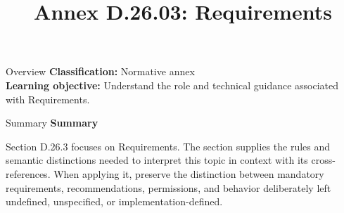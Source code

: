 \documentclass[10pt,letterpaper]{article}
\title{Annex D.26.03: Requirements}
\author{}
\date{}
\begin{document}
\maketitle
\begin{CornellOverviewBox}{Overview}
\textbf{Classification:} Normative annex\\[2pt]
\textbf{Learning objective:} Understand the role and technical guidance associated with Requirements.
\end{CornellOverviewBox}\begin{CornellSummaryBox}{Summary}
{\sffamily\bfseries\color{Accent} Summary}\par\vspace{3pt}Section D.26.3 focuses on Requirements. The section supplies the rules and semantic distinctions needed to interpret this topic in context with its cross-references. When applying it, preserve the distinction between mandatory requirements, recommendations, permissions, and behavior deliberately left undefined, unspecified, or implementation-defined.
\end{CornellSummaryBox}
\end{document}
